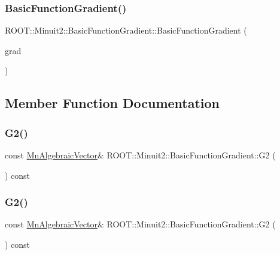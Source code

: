 \subsubsection{\texorpdfstring{BasicFunctionGradient()}{BasicFunctionGradient()}\hspace{0.1cm}{\footnotesize\ttfamily [12/12]}}
{\footnotesize\ttfamily R\+O\+O\+T\+::\+Minuit2\+::\+Basic\+Function\+Gradient\+::\+Basic\+Function\+Gradient (\begin{DoxyParamCaption}\item[{const \mbox{\hyperlink{classROOT_1_1Minuit2_1_1BasicFunctionGradient}{Basic\+Function\+Gradient}} \&}]{grad }\end{DoxyParamCaption})\hspace{0.3cm}{\ttfamily [inline]}}



\subsection{Member Function Documentation}
\mbox{\label{classROOT_1_1Minuit2_1_1BasicFunctionGradient_a7d06765b80da1a8baa4af474b503ec6c}} 
\subsubsection{\texorpdfstring{G2()}{G2()}\hspace{0.1cm}{\footnotesize\ttfamily [1/3]}}
{\footnotesize\ttfamily const \mbox{\hyperlink{namespaceROOT_1_1Minuit2_a62ed97730a1ca8d3fbaec64a19aa11c9}{Mn\+Algebraic\+Vector}}\& R\+O\+O\+T\+::\+Minuit2\+::\+Basic\+Function\+Gradient\+::\+G2 (\begin{DoxyParamCaption}{ }\end{DoxyParamCaption}) const\hspace{0.3cm}{\ttfamily [inline]}}

\mbox{\label{classROOT_1_1Minuit2_1_1BasicFunctionGradient_a7d06765b80da1a8baa4af474b503ec6c}} 
\subsubsection{\texorpdfstring{G2()}{G2()}\hspace{0.1cm}{\footnotesize\ttfamily [2/3]}}
{\footnotesize\ttfamily const \mbox{\hyperlink{namespaceROOT_1_1Minuit2_a62ed97730a1ca8d3fbaec64a19aa11c9}{Mn\+Algebraic\+Vector}}\& R\+O\+O\+T\+::\+Minuit2\+::\+Basic\+Function\+Gradient\+::\+G2 (\begin{DoxyParamCaption}{ }\end{DoxyParamCaption}) const\hspace{0.3cm}{\ttfamily [inline]}}

